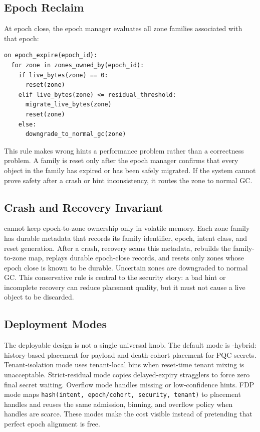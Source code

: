 \subsection{Epoch Reclaim}

At epoch close, the epoch manager evaluates all zone families associated with that epoch:

\begin{lstlisting}[caption={Conservative epoch reclaim.},label={lst:reclaim}]
on epoch_expire(epoch_id):
  for zone in zones_owned_by(epoch_id):
    if live_bytes(zone) == 0:
      reset(zone)
    elif live_bytes(zone) <= residual_threshold:
      migrate_live_bytes(zone)
      reset(zone)
    else:
      downgrade_to_normal_gc(zone)
\end{lstlisting}

This rule makes wrong hints a performance problem rather than a correctness problem.  A family is reset only after the epoch manager confirms that every object in the family has expired or has been safely migrated.  If the system cannot prove safety after a crash or hint inconsistency, it routes the zone to normal GC.

\subsection{Crash and Recovery Invariant}

\system cannot keep epoch-to-zone ownership only in volatile memory.  Each zone family has durable metadata that records its family identifier, epoch, intent class, and reset generation.  After a crash, recovery scans this metadata, rebuilds the family-to-zone map, replays durable epoch-close records, and resets only zones whose epoch close is known to be durable.  Uncertain zones are downgraded to normal GC.  This conservative rule is central to the security story: a bad hint or incomplete recovery can reduce placement quality, but it must not cause a live object to be discarded.

\subsection{Deployment Modes}

The deployable design is not a single universal knob.  The default mode is \system-\dogi hybrid: history-based placement for payload and death-cohort placement for PQC secrets.  Tenant-isolation mode uses tenant-local bins when reset-time tenant mixing is unacceptable.  Strict-residual mode copies delayed-expiry stragglers to force zero final secret waiting.  Overflow mode handles missing or low-confidence hints.  FDP mode maps \texttt{hash(intent, epoch/cohort, security, tenant)} to placement handles and reuses the same admission, binning, and overflow policy when handles are scarce.  These modes make the cost visible instead of pretending that perfect epoch alignment is free.
